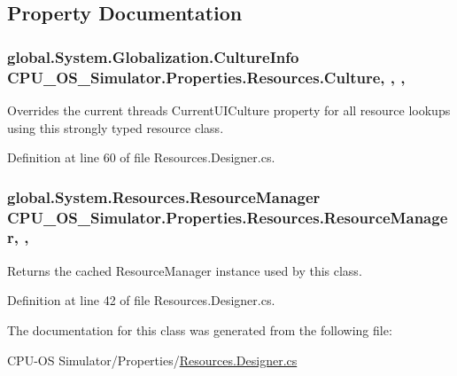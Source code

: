 \subsection{Property Documentation}
\hypertarget{class_c_p_u___o_s___simulator_1_1_properties_1_1_resources_afb07c44f770e3a53a2df87db2ebd9af3}{}
\subsubsection[{Culture}]{\setlength{\rightskip}{0pt plus 5cm}global.\+System.\+Globalization.\+Culture\+Info C\+P\+U\+\_\+\+O\+S\+\_\+\+Simulator.\+Properties.\+Resources.\+Culture\hspace{0.3cm}{\ttfamily [static]}, {\ttfamily [get]}, {\ttfamily [set]}, {\ttfamily [package]}}\label{class_c_p_u___o_s___simulator_1_1_properties_1_1_resources_afb07c44f770e3a53a2df87db2ebd9af3}


Overrides the current thread\textquotesingle{}s Current\+U\+I\+Culture property for all resource lookups using this strongly typed resource class. 



Definition at line 60 of file Resources.\+Designer.\+cs.

\hypertarget{class_c_p_u___o_s___simulator_1_1_properties_1_1_resources_a59a57fa23c17b7afe97c18c6cb3c30cc}{}
\subsubsection[{Resource\+Manager}]{\setlength{\rightskip}{0pt plus 5cm}global.\+System.\+Resources.\+Resource\+Manager C\+P\+U\+\_\+\+O\+S\+\_\+\+Simulator.\+Properties.\+Resources.\+Resource\+Manager\hspace{0.3cm}{\ttfamily [static]}, {\ttfamily [get]}, {\ttfamily [package]}}\label{class_c_p_u___o_s___simulator_1_1_properties_1_1_resources_a59a57fa23c17b7afe97c18c6cb3c30cc}


Returns the cached Resource\+Manager instance used by this class. 



Definition at line 42 of file Resources.\+Designer.\+cs.



The documentation for this class was generated from the following file\+:\begin{DoxyCompactItemize}
\item 
C\+P\+U-\/\+O\+S Simulator/\+Properties/\hyperlink{_resources_8_designer_8cs}{Resources.\+Designer.\+cs}\end{DoxyCompactItemize}
